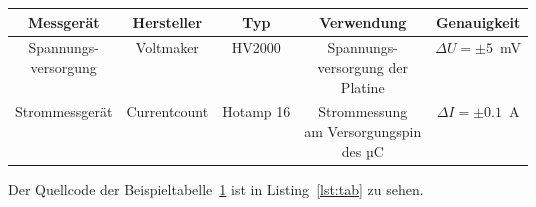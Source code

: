 \begin{table}[hbt]	
	\centering
	\renewcommand{\arraystretch}{1.5}	%
	\label{tab:bsp}
	\begin{tabular}{ccccc}
		\textbf{Messgerät} & \textbf{Hersteller} & \textbf{Typ} & \textbf{Verwendung} & \textbf{Genauigkeit}\\ 
		\hline 
		\hline 
		\parbox[t]{0.2\linewidth}{\centering Spannungs-\\versorgung} & Voltmaker & HV2000 & \parbox[t]{0.2\linewidth}{\centering Spannungs-\\versorgung der\\Platine} & $\Delta U = \pm 5 $~mV \\ %
		Strommessgerät & Currentcount & Hotamp 16 & \parbox[t]{0.2\linewidth}{ \centering Strommessung\\am Versorgungspin\\des µC} & $\Delta I = \pm 0.1$~A \\ 
		\hline 
	\end{tabular} 
\end{table}

Der Quellcode der Beispieltabelle~\ref{tab:bsp} ist in Listing~\ref{lst:tab} zu sehen.

